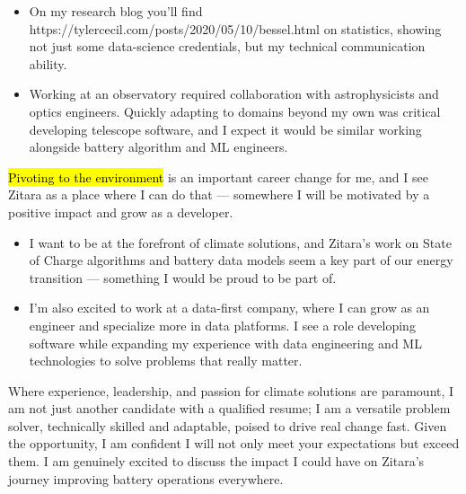 \documentclass{tc_cv}
\begin{document}
\begin{adjustwidth}{38pt}{38pt}
\begin{itemize}
    \item On my research blog you'll find \cite{Jupyter
      notebooks}{https://tylercecil.com/posts/2020/05/10/bessel.html} on
      statistics, showing not just some data-science credentials, but my
      technical communication ability.

    \item Working at an observatory required collaboration with astrophysicists
      and optics engineers. Quickly adapting to domains beyond my own was
      critical developing telescope software, and I expect it would be similar
      working alongside battery algorithm and ML engineers.

  \end{itemize} \medskip

  \hl{Pivoting to the environment} is an important career change for me,
  and I see Zitara as a place where I can do that --- somewhere I will be
  motivated by a positive impact and grow as a developer.
  \begin{itemize}

    \item I want to be at the forefront of climate solutions, and Zitara's work
      on State of Charge algorithms and battery data models seem a key part of
      our energy transition --- something I would be proud to be part of.

    \item I'm also excited to work at a data-first company, where I can grow as
      an engineer and specialize more in data platforms. I see a role
      developing software while expanding my experience with data engineering
      and ML technologies to solve problems that really matter.

  \end{itemize} \medskip

  Where experience, leadership, and passion for climate solutions are
  paramount, I am not just another candidate with a qualified resume; I am a
  versatile problem solver, technically skilled and adaptable, poised to drive
  real change fast. Given the opportunity, I am confident I will not only meet
  your expectations but exceed them. I am genuinely excited to discuss the
  impact I could have on Zitara's journey improving battery operations
  everywhere.


\end{adjustwidth}
\end{document}
